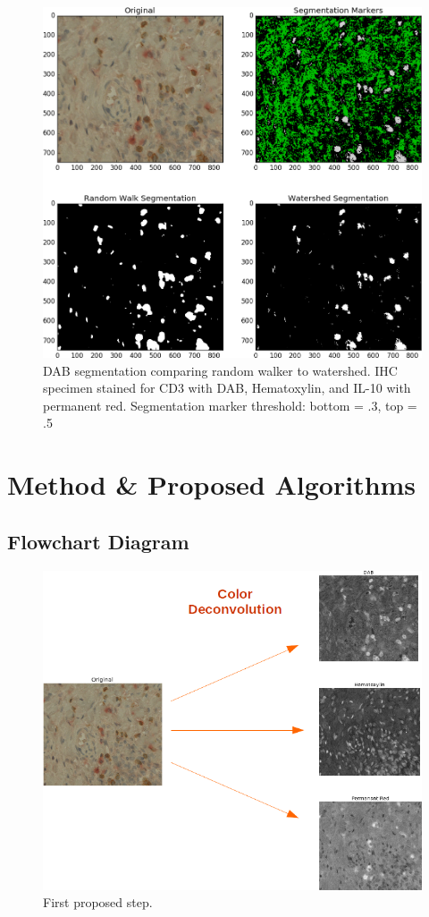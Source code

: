 \documentclass[12pt]{article}
\begin{document}
\begin{figure}[H]
  \includegraphics[width=\linewidth]{RWSvsWatershed5.png}
  \caption{DAB segmentation comparing random walker to watershed. IHC specimen stained for CD3 with DAB, Hematoxylin, and IL-10 with permanent red. Segmentation marker threshold: bottom = .3, top = .5}
  \label{fig:RWSvsWatershed5}
\end{figure}



\section*{Method \& Proposed Algorithms}
\subsection*{Flowchart Diagram}


\begin{figure}[H]
  \includegraphics[width=\linewidth]{ColorDeconvFlow6.png}
  \caption{First proposed step.}
  \label{fig:ColorDeconvFlow6}
\end{figure}
\end{document}
